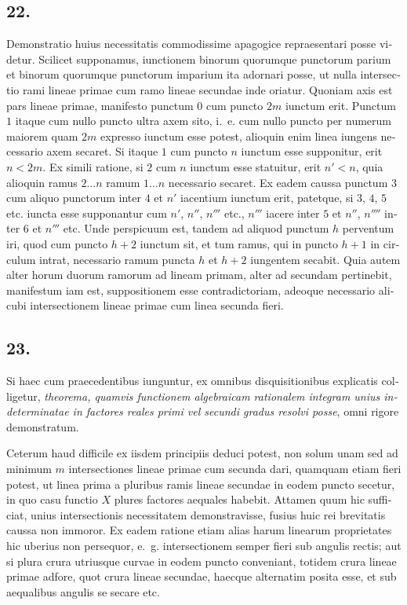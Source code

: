 \documentclass[12pt,a4paper]{article}
\begin{document}
\begin{otherlanguage}{latin}
\subsection*{22.}
Demonstratio huius necessitatis commodissime apagogice repraesentari posse videtur. Scilicet supponamus, iunctionem binorum quorumque punctorum parium et binorum quorumque punctorum imparium ita adornari posse, ut nulla intersectio rami lineae primae cum ramo lineae secundae inde oriatur. Quoniam axis est pars lineae primae, manifesto punctum $0$ cum puncto $2m$ iunctum erit. Punctum $1$ itaque cum nullo puncto ultra axem sito, i.~e. cum nullo puncto per numerum maiorem quam $2m$ expresso iunctum esse potest, alioquin enim linea iungens necessario axem secaret. Si itaque $1$ cum puncto $n$ iunctum esse supponitur, erit $n<2m$. Ex simili ratione, si $2$ cum $n$ iunctum esse statuitur, erit $n'<n$, quia alioquin ramus $2\ldots n$ ramum $1\ldots n$ necessario secaret. Ex eadem caussa punctum $3$ cum aliquo punctorum inter $4$ et $n'$ iacentium iunctum erit, patetque, si $3$, $4$, $5$ etc. iuncta esse supponantur cum $n'$, $n''$, $n'''$ etc., $n'''$ iacere inter $5$ et $n''$, $n''''$ inter $6$ et $n'''$ etc. Unde perspicuum est, tandem ad aliquod punctum $h$ perventum iri, quod cum puncto $h+2$ iunctum sit, et tum ramus, qui in puncto $h+1$ in circulum intrat, necessario ramum puncta $h$ et $h+2$ iungentem secabit. Quia autem alter horum duorum ramorum ad lineam primam, alter ad secundam pertinebit, manifestum iam est, suppositionem esse contradictoriam, adeoque necessario alicubi intersectionem lineae primae cum linea secunda fieri.

\subsection*{23.}
Si haec cum praecedentibus iunguntur, ex omnibus disquisitionibus explicatis colligetur, \textit{theorema, quamvis functionem algebraicam rationalem integram unius indeterminatae in factores reales primi vel secundi gradus resolvi posse}, omni rigore demonstratum.

Ceterum haud difficile ex iisdem principiis deduci potest, non solum unam sed ad minimum $m$ intersectiones lineae primae cum secunda dari, quamquam etiam fieri potest, ut linea prima a pluribus ramis lineae secundae in eodem puncto secetur, in quo casu functio $X$ plures factores aequales habebit. Attamen quum hic sufficiat, unius intersectionis necessitatem demonstravisse, fusius huic rei brevitatis caussa non immoror. Ex eadem ratione etiam alias harum linearum proprietates hic uberius non persequor, e.~g. intersectionem semper fieri sub angulis rectis; aut si plura crura utriusque curvae in eodem puncto conveniant, totidem crura lineae primae adfore, quot crura lineae secundae, haecque alternatim posita esse, et sub aequalibus angulis se secare etc.


\end{otherlanguage}
\end{document}
